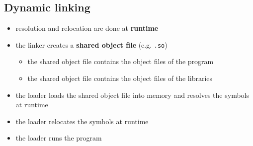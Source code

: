 \documentclass[letterpaper,12pt]{article}
\begin{document}
\subsection{Dynamic linking}
\begin{itemize}
    \item resolution and relocation are done at \textbf{runtime}
    \item the linker creates a \textbf{shared object file} (e.g. \texttt{.so})\begin{itemize}
        \item the shared object file contains the object files of the program
        \item the shared object file contains the object files of the libraries
    \end{itemize}
    \item the loader loads the shared object file into memory and resolves the symbols at runtime
    \item the loader relocates the symbols at runtime
    \item the loader runs the program
\end{itemize}
\end{document}
